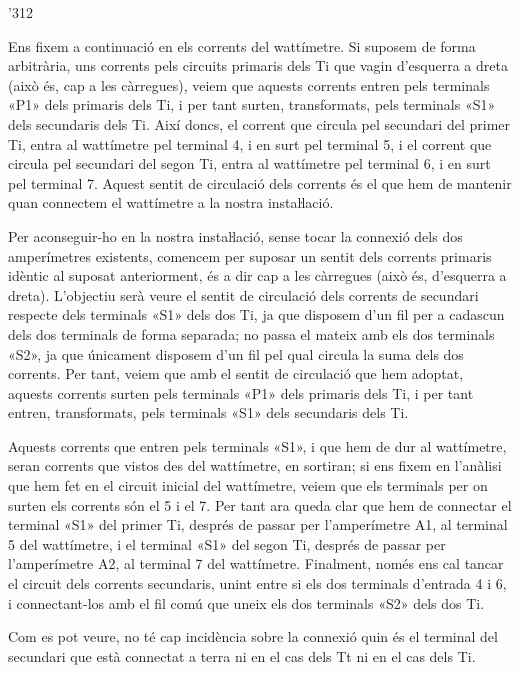 \begin{exemple}
\begin{dingautolist}{'312}
    \item Ens fixem a continuació en els corrents del wattímetre. Si suposem
    de forma arbitrària, uns corrents pels circuits primaris dels Ti
    que vagin d'esquerra a dreta (això és, cap a les càrregues), veiem
    que aquests corrents entren pels terminals «\textsf{P1}» dels primaris dels Ti,
    i per tant surten, transformats, pels terminals «\textsf{S1}» dels secundaris
    dels Ti. Així doncs, el corrent que circula pel secundari del primer
    Ti, entra al wattímetre pel terminal 4, i en surt pel terminal 5, i
    el corrent que circula pel secundari del segon Ti, entra al
    wattímetre pel terminal 6, i en surt pel terminal 7. Aquest sentit
    de circulació dels corrents és el que hem de mantenir quan
    connectem el wattímetre a la nostra instaŀlació.

    Per aconseguir-ho en la nostra instaŀlació, sense tocar la
    connexió dels dos amperímetres existents, comencem per suposar un
    sentit dels corrents primaris idèntic al suposat anteriorment, és a
    dir cap a les càrregues (això és, d'esquerra a dreta). L'objectiu
    serà veure el sentit de circulació dels corrents de secundari
    respecte dels terminals «\textsf{S1}» dels dos Ti, ja que disposem d'un fil per
    a cadascun dels dos terminals de forma separada; no passa el mateix
    amb els dos terminals «\textsf{S2}», ja que únicament disposem d'un fil pel
    qual circula la suma dels dos corrents. Per tant, veiem que amb el
    sentit de circulació que hem adoptat, aquests corrents surten pels
    terminals «\textsf{P1}» dels primaris dels Ti, i per tant entren, transformats,
    pels terminals «\textsf{S1}» dels secundaris dels Ti.

    Aquests corrents que entren pels terminals «\textsf{S1}», i que hem de dur al
    wattímetre, seran corrents que vistos des del wattímetre, en
    sortiran; si ens fixem en l'anàlisi que hem fet en el
    circuit inicial del wattímetre, veiem que els terminals per on surten
    els corrents són el 5 i el 7. Per tant ara queda clar que hem de
    connectar el terminal «\textsf{S1}» del primer Ti, després de passar per
    l'amperímetre \textsf{A1}, al terminal 5 del wattímetre, i el
    terminal «\textsf{S1}» del segon Ti, després de passar per l'amperímetre
    \textsf{A2}, al terminal 7 del wattímetre. Finalment, només ens cal
    tancar el circuit dels corrents secundaris, unint entre si els dos
    terminals d'entrada 4  i 6, i connectant-los amb el fil comú que
    uneix els dos terminals «\textsf{S2}» dels dos Ti.

    Com es pot veure, no té cap incidència sobre la connexió quin és
    el terminal del secundari que està connectat a terra ni en el cas
    dels Tt ni en el cas dels Ti.
    \end{dingautolist}

     \begin{center}
        
    \end{center}

\end{exemple}
